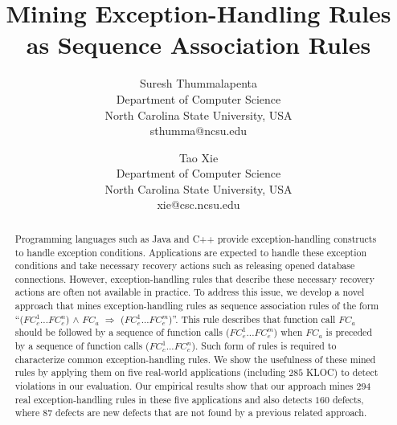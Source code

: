 \documentclass[times, 10pt,twocolumn]{article}
\begin{document}
\title{Mining Exception-Handling Rules as Sequence Association Rules}


\author{Suresh Thummalapenta\\
Department of Computer Science\\ 
North Carolina State University, USA\\ sthumma@ncsu.edu\\
\and
Tao Xie\\
Department of Computer Science\\ 
North Carolina State University, USA\\ xie@csc.ncsu.edu\\
}
\maketitle
\thispagestyle{empty}
\pagestyle{empty}
\begin{abstract}\vspace*{-1ex}
Programming languages such as Java and C++ provide exception-handling 
constructs to handle exception conditions.
Applications are expected to handle these exception conditions and take necessary recovery
actions such as releasing opened database connections. 
However, exception-handling rules that describe these necessary recovery actions
are often not available in practice. To address this issue, we develop a novel 
approach that mines exception-handling rules as sequence association rules 
of the form ``($FC_c^1$...$FC_c^n$) $\wedge$ $FC_a$ $\Rightarrow$ ($FC_e^1$...$FC_e^m$)''.
This rule describes that function call $FC_a$ should be followed by a sequence of 
function calls ($FC_e^1$...$FC_e^m$) when $FC_a$ is preceded by a sequence of function calls
($FC_c^1$...$FC_c^n$). Such form of rules is required to characterize common exception-handling rules.
We show the usefulness of these mined rules by applying them on five real-world applications (including $285$ KLOC)
to detect violations in our evaluation.
Our empirical results show that our approach mines $294$ real exception-handling
rules in these five applications  and 
also detects $160$ defects, where $87$ defects are new defects that are not found by a previous related approach.
\end{abstract}
\vspace*{-4ex}
\end{document}
